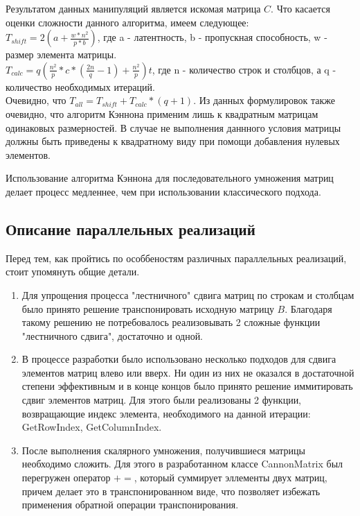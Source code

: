\documentclass[20pt]{article}
\begin{document}
Результатом данных манипуляций является искомая матрица $C$. Что касается оценки сложности данного алгоритма, имеем следующее: \\
$T_{shift} = 2( a + \frac{w * n^2}{p * b})$, где a - латентность, b - пропускная способность, w - размер элемента матрицы. \\

$T_{calc} = q(\frac{n^2}{p} * c * (\frac{2n}{q} - 1) + \frac{n^2}{p})t$, где n - количество строк и столбцов, а q - количество необходимых итераций. \\

Очевидно, что $T_{all} = T_{shift} + T_{calc} * (q + 1)$. Из данных формулировок также очевидно, что алгоритм Кэннона применим лишь к квадратным матрицам одинаковых размерностей. В случае не выполнения даннного условия матрицы должны быть приведены к квадратному виду при помощи добавления нулевых элементов.

Использование алгоритма Кэннона для последовательного умножения матриц делает процесс медленнее, чем при использовании классического подхода.
\newpage
\begin{center}
    \section{Описание параллельных реализаций}
\end{center}

Перед тем, как пройтись по особбеностям различных параллельных реализаций, стоит упомянуть общие детали.

\begin{enumerate}
    \item Для упрощения процесса "лестничного" сдвига матриц по строкам и столбцам было принято решение транспонировать исходную матрицу $B$. Благодаря такому решению не потребовалось реализовывать 2 сложные функции "лестничного сдвига", достаточно и одной.
    \item В процессе разработки было использовано несколько подходов для сдвига элементов матриц влево или вверх. Ни один из них не оказался в достаточной степени эффективным и в конце концов было принято решение иммитировать сдвиг элементов матриц. Для этого были реализованы 2 функции, возвращающие индекс элемента, необходимого на данной итерации: GetRowIndex, GetColumnIndex. 
    \item После выполнения скалярного умножения, получившиеся матрицы необходимо сложить. Для этого в разработанном классе CannonMatrix был перегружен оператор $+=$, который суммирует эллементы двух матриц, причем делает это в транспонированном виде, что позволяет избежать применения обратной операции транспонирования.
\end{enumerate} 
\end{document}
